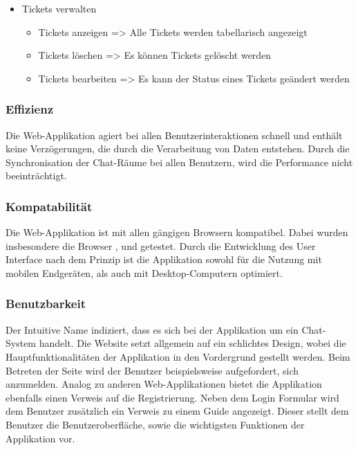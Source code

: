 \begin{itemize}
\begin{itemize}
\begin{itemize}
      \end{itemize}
    \item Tickets verwalten
      \begin{itemize}
        \item Tickets anzeigen
        \newline
        => Alle Tickets werden tabellarisch angezeigt
        \item Tickets löschen
        \newline
        => Es können Tickets gelöscht werden
        \item Tickets bearbeiten
        \newline
        => Es kann der Status eines Tickets geändert werden
      \end{itemize}  
    \end{itemize}   
\end{itemize}

\subsubsection{Effizienz}
Die Web-Applikation agiert bei allen Benutzerinteraktionen schnell und enthält keine Verzögerungen, die durch die Verarbeitung von Daten entstehen. 
Durch die Synchronisation der Chat-Räume bei allen Benutzern, wird die Performance nicht beeinträchtigt.

\subsubsection{Kompatabilität}\label{sec:Kompatibilitaet}
Die Web-Applikation  ist mit allen gängigen Browsern kompatibel.
Dabei wurden insbesondere die Browser ,  und  getestet.
Durch die Entwicklung des User Interface nach dem Prinzip  ist die Applikation sowohl für die Nutzung mit mobilen Endgeräten, als auch mit Desktop-Computern optimiert.

\subsubsection{Benutzbarkeit}
Der Intuitive Name  indiziert, dass es sich bei der Applikation um ein Chat-System handelt.
Die Website setzt allgemein auf ein schlichtes Design, wobei die Hauptfunktionalitäten der Applikation in den Vordergrund gestellt werden.
Beim Betreten der Seite wird der Benutzer beispielsweise aufgefordert, sich anzumelden.
Analog zu anderen Web-Applikationen bietet die Applikation ebenfalls einen Verweis auf die Registrierung.
Neben dem Login Formular wird dem Benutzer zusätzlich ein Verweis zu einem  Guide angezeigt.
Dieser stellt dem Benutzer die Benutzeroberfläche, sowie die wichtigsten Funktionen der Applikation vor.

